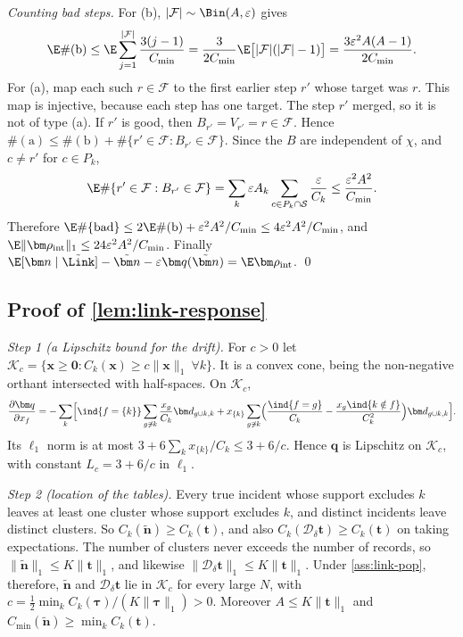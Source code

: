 \emph{Counting bad steps.} For (b), $|\mathcal F|\sim\Bin(A,\varepsilon)$ gives
\[
  \E\#(\mathrm b)\le\E\sum_{j=1}^{|\mathcal F|}\frac{3(j-1)}{C_{\min}}=\frac{3}{2C_{\min}}\E\bigl[|\mathcal F|(|\mathcal F|-1)\bigr]=\frac{3\varepsilon^2A(A-1)}{2C_{\min}} .
\]
For (a), map each such $r\in\mathcal F$ to the first earlier step $r'$ whose target was $r$. This map is injective, because each step has one target. The step $r'$ merged, so it is not of type (a). If $r'$ is good, then $B_{r'}=V_{r'}=r\in\mathcal F$. Hence $\#(\mathrm a)\le\#(\mathrm b)+\#\{r'\in\mathcal F:B_{r'}\in\mathcal F\}$. Since the $B$ are independent of $\chi$, and $c\ne r'$ for $c\in P_k$,
\[
  \E\#\{r'\in\mathcal F:B_{r'}\in\mathcal F\}=\sum_k\varepsilon A_k\sum_{c\in P_k\cap\mathcal S}\frac{\varepsilon}{C_k}\le\frac{\varepsilon^2A^2}{C_{\min}} .
\]
Therefore $\E\#\{\text{bad}\}\le2\E\#(\mathrm b)+\varepsilon^2A^2/C_{\min}\le4\varepsilon^2A^2/C_{\min}$, and $\E\|\bm\rho_{\mathrm{int}}\|_1\le24\varepsilon^2A^2/C_{\min}$. Finally $\E[\bm n\mid\tilde\Link]-\tilde{\bm n}-\varepsilon\bm q(\tilde{\bm n})=\E\bm\rho_{\mathrm{int}}$. \qed

\subsection{Proof of \texorpdfstring{\cref{lem:link-response}}{the split-merge calculus}}\label{app:link-response}

\emph{Step 1 (a Lipschitz bound for the drift).} For $c>0$ let $\mathcal K_c=\{\bm x\ge\bm0:C_k(\bm x)\ge c\|\bm x\|_1\ \forall k\}$. It is a convex cone, being the non-negative orthant intersected with half-spaces. On $\mathcal K_c$,
\[
  \frac{\partial\bm q}{\partial x_f}=-\sum_k\Bigl[\ind{f=\{k\}}\sum_{g\not\ni k}\frac{x_g}{C_k}\bm d_{g\cup k,k}
  +x_{\{k\}}\sum_{g\not\ni k}\Bigl(\frac{\ind{f=g}}{C_k}-\frac{x_g\ind{k\notin f}}{C_k^2}\Bigr)\bm d_{g\cup k,k}\Bigr].
\]
Its $\ell_1$ norm is at most $3+6\sum_kx_{\{k\}}/C_k\le3+6/c$. Hence $\bm q$ is Lipschitz on $\mathcal K_c$, with constant $L_c=3+6/c$ in $\ell_1$.

\emph{Step 2 (location of the tables).} Every true incident whose support excludes $k$ leaves at least one cluster whose support excludes $k$, and distinct incidents leave distinct clusters. So $C_k(\tilde{\bm n})\ge C_k(\bm t)$, and also $C_k(\mathcal D_\delta\bm t)\ge C_k(\bm t)$ on taking expectations. The number of clusters never exceeds the number of records, so $\|\tilde{\bm n}\|_1\le K\|\bm t\|_1$, and likewise $\|\mathcal D_\delta\bm t\|_1\le K\|\bm t\|_1$. Under \cref{ass:link-pop}, therefore, $\tilde{\bm n}$ and $\mathcal D_\delta\bm t$ lie in $\mathcal K_c$ for every large $N$, with $c=\tfrac12\min_kC_k(\bm\tau)/(K\|\bm\tau\|_1)>0$. Moreover $A\le K\|\bm t\|_1$ and $C_{\min}(\tilde{\bm n})\ge\min_kC_k(\bm t)$.

